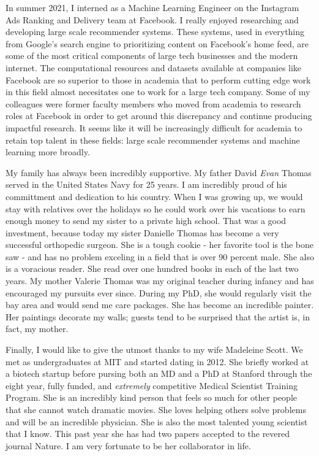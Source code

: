 In summer 2021, I interned as a Machine Learning Engineer on the Instagram Ads Ranking and Delivery team at Facebook. I really enjoyed researching and developing large scale recommender systems. These systems, used in everything from Google's search engine to prioritizing content on Facebook's home feed, are some of the most critical components of large tech businesses and the modern internet. The computational resources and datasets available at companies like Facebook are so superior to those in academia that to perform cutting edge work in this field almost necesitates one to work for a large tech company. Some of my colleagues were former faculty members who moved from academia to research roles at Facebook in order to get around this discrepancy and continue producing impactful research. It seems like it will be increasingly difficult for academia to retain top talent in these fields: large scale recommender systems and machine learning more broadly.  

My family has always been incredibly supportive. My father David \textit{Evan} Thomas served in the United States Navy for 25 years. I am incredibly proud of his committment and dedication to his country. When I was growing up, we would stay with relatives over the holidays so he could work over his vacations to earn enough money to send my sister to a private high school. That was a good investment, because today my sister Danielle Thomas has become a very successful orthopedic surgeon. She is a tough cookie - her favorite tool is the bone saw - and has no problem exceling in a field that is over 90 percent male. She also is a voracious reader. She read over one hundred books in each of the last two years. My mother Valerie Thomas was my original teacher during infancy and has encouraged my pursuits ever since. During my PhD, she would regularly visit the bay area and would send me care packages. She has become an incredible painter. Her paintings decorate my walls; guests tend to be surprised that the artist is, in fact, my mother.

Finally, I would like to give the utmost thanks to my wife Madeleine Scott. We met as undergraduates at MIT and started dating in 2012. She briefly worked at a biotech startup before pursing both an MD and a PhD at Stanford through the eight year, fully funded, and \textit{extremely} competitive Medical Scientist Training Program. She is an incredibly kind person that feels so much for other people that she cannot watch dramatic movies. She loves helping others solve problems and will be an incredible physician. She is also the most talented young scientist that I know. This past year she has had two papers accepted to the revered journal Nature. I am very fortunate to be her collaborator in life. 

